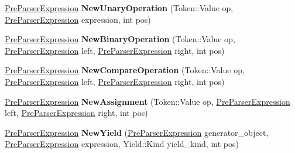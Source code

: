 \begin{DoxyCompactItemize}
\item 
\hypertarget{classv8_1_1internal_1_1_pre_parser_factory_ad2cb4901b18a404a712232e2798f72ff}{}\hyperlink{classv8_1_1internal_1_1_pre_parser_expression}{Pre\+Parser\+Expression} {\bfseries New\+Unary\+Operation} (Token\+::\+Value op, \hyperlink{classv8_1_1internal_1_1_pre_parser_expression}{Pre\+Parser\+Expression} expression, int pos)\label{classv8_1_1internal_1_1_pre_parser_factory_ad2cb4901b18a404a712232e2798f72ff}

\item 
\hypertarget{classv8_1_1internal_1_1_pre_parser_factory_a3dc279212140af16337c2889d913f1f5}{}\hyperlink{classv8_1_1internal_1_1_pre_parser_expression}{Pre\+Parser\+Expression} {\bfseries New\+Binary\+Operation} (Token\+::\+Value op, \hyperlink{classv8_1_1internal_1_1_pre_parser_expression}{Pre\+Parser\+Expression} left, \hyperlink{classv8_1_1internal_1_1_pre_parser_expression}{Pre\+Parser\+Expression} right, int pos)\label{classv8_1_1internal_1_1_pre_parser_factory_a3dc279212140af16337c2889d913f1f5}

\item 
\hypertarget{classv8_1_1internal_1_1_pre_parser_factory_a192024d13ed7e968dde055ed7fea08bf}{}\hyperlink{classv8_1_1internal_1_1_pre_parser_expression}{Pre\+Parser\+Expression} {\bfseries New\+Compare\+Operation} (Token\+::\+Value op, \hyperlink{classv8_1_1internal_1_1_pre_parser_expression}{Pre\+Parser\+Expression} left, \hyperlink{classv8_1_1internal_1_1_pre_parser_expression}{Pre\+Parser\+Expression} right, int pos)\label{classv8_1_1internal_1_1_pre_parser_factory_a192024d13ed7e968dde055ed7fea08bf}

\item 
\hypertarget{classv8_1_1internal_1_1_pre_parser_factory_a26329fb85960f6ca977bc611780a6620}{}\hyperlink{classv8_1_1internal_1_1_pre_parser_expression}{Pre\+Parser\+Expression} {\bfseries New\+Assignment} (Token\+::\+Value op, \hyperlink{classv8_1_1internal_1_1_pre_parser_expression}{Pre\+Parser\+Expression} left, \hyperlink{classv8_1_1internal_1_1_pre_parser_expression}{Pre\+Parser\+Expression} right, int pos)\label{classv8_1_1internal_1_1_pre_parser_factory_a26329fb85960f6ca977bc611780a6620}

\item 
\hypertarget{classv8_1_1internal_1_1_pre_parser_factory_a12ae51f5f47eca87cb943780019408cf}{}\hyperlink{classv8_1_1internal_1_1_pre_parser_expression}{Pre\+Parser\+Expression} {\bfseries New\+Yield} (\hyperlink{classv8_1_1internal_1_1_pre_parser_expression}{Pre\+Parser\+Expression} generator\+\_\+object, \hyperlink{classv8_1_1internal_1_1_pre_parser_expression}{Pre\+Parser\+Expression} expression, Yield\+::\+Kind yield\+\_\+kind, int pos)\label{classv8_1_1internal_1_1_pre_parser_factory_a12ae51f5f47eca87cb943780019408cf}


\end{DoxyCompactItemize}

